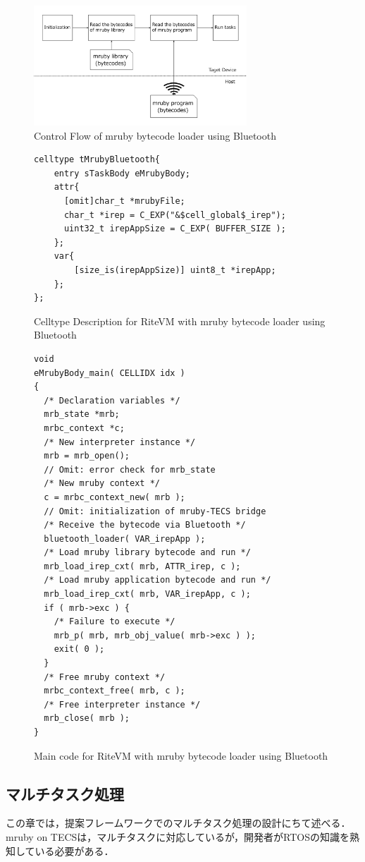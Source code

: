 \documentclass[submit]{ipsj_v2/UTF8/ipsj}
\begin{document}
\begin{figure}[t]
    \centering
    \includegraphics[width=8cm,clip]{../EMSOFT2016/figure/control_flow.pdf}
    \caption{Control Flow of mruby bytecode loader using Bluetooth}
    \label{fig:control_flow}
\end{figure}
\begin{figure}[t]
\centering
\begin{lstlisting}
celltype tMrubyBluetooth{
    entry sTaskBody eMrubyBody;
    attr{
      [omit]char_t *mrubyFile;
      char_t *irep = C_EXP("&$cell_global$_irep");
      uint32_t irepAppSize = C_EXP( BUFFER_SIZE );
    };
    var{
        [size_is(irepAppSize)] uint8_t *irepApp;
    };
};
\end{lstlisting}
\caption{Celltype Description for RiteVM with mruby bytecode loader using Bluetooth}
\label{celltype_mrubybluetooth}
\end{figure}
\begin{figure}[t]
\centering
\begin{lstlisting}
void
eMrubyBody_main( CELLIDX idx )
{
  /* Declaration variables */
  mrb_state *mrb;
  mrbc_context *c;
  /* New interpreter instance */
  mrb = mrb_open();
  // Omit: error check for mrb_state
  /* New mruby context */
  c = mrbc_context_new( mrb );
  // Omit: initialization of mruby-TECS bridge
  /* Receive the bytecode via Bluetooth */
  bluetooth_loader( VAR_irepApp );
  /* Load mruby library bytecode and run */
  mrb_load_irep_cxt( mrb, ATTR_irep, c );
  /* Load mruby application bytecode and run */
  mrb_load_irep_cxt( mrb, VAR_irepApp, c );
  if ( mrb->exc ) {
    /* Failure to execute */
    mrb_p( mrb, mrb_obj_value( mrb->exc ) );
    exit( 0 );
  }
  /* Free mruby context */
  mrbc_context_free( mrb, c );
  /* Free interpreter instance */
  mrb_close( mrb );
}

\end{lstlisting}
\caption{Main code for RiteVM with mruby bytecode loader using Bluetooth}
\label{maincode_mrubybluetooth}
\end{figure}
\subsection{マルチタスク処理}
\label{sec:Multitask}
この章では，提案フレームワークでのマルチタスク処理の設計にちて述べる．
mruby on TECSは，マルチタスクに対応しているが，開発者がRTOSの知識を熟知している必要がある．
\end{document}
